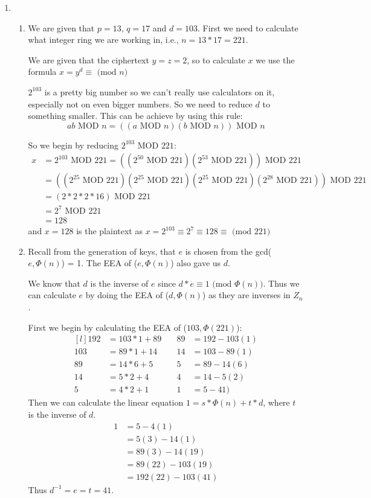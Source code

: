 \documentclass{article}
\begin{document}
\begin{enumerate}
		\item 
		\begin{enumerate}
			\item We are given that $p = 13$, $q = 17$ and $d = 103$. First we need to calculate what integer ring we are working in, i.e., $n = 13* 17 = 221$.
			
			We are given that the ciphertext $y = z = 2$, so to calculate $x$ we use the formula $x = y^d \equiv \text{ (mod } n)$
			
			$2^{103}$ is a pretty big number so we can't really use calculators on it, especially not on even bigger numbers. So we need to reduce $d$ to something smaller. This can be achieve by using this rule:
			$$
			ab \text{ MOD } n = ((a \text{ MOD } n)(b \text{ MOD } n)) \text{ MOD } n
			$$
			
			So we begin by reducing $2^{103} \text{ MOD } 221$:
			\[
			\begin{split}
				x&=2^{103} \text{ MOD } 221 = ((2^{50} \text{ MOD } 221)(2^{53} \text{ MOD } 221)) \text{ MOD } 221\\
				&=((2^{25} \text{ MOD } 221)(2^{25} \text{ MOD } 221)(2^{25} \text{ MOD } 221)(2^{28} \text{ MOD } 221)) \text{ MOD } 221\\
				&=(2*2*2*16) \text{ MOD } 221\\
				&=2^7 \text{ MOD } 221\\
				&=128
			\end{split}
			\]
			and $x = 128$ is the plaintext as $x = 2^{103} \equiv 2^7 \equiv 128 \equiv \text{ (mod } 221)$
			
			\item Recall from the generation of keys, that $e$ is chosen from the gcd($e, \Phi(n)$) = 1. The EEA of ($e, \Phi(n)$) also gave us $d$. 
			
			We know that $d$ is the inverse of $e$ since $d*e \equiv 1 \text{ (mod } \Phi(n))$. Thus we can calculate $e$ by doing the EEA of ($d, \Phi(n)$) as they are inverses in $Z_n$.
			
			First we begin by calculating the EEA of ($103, \Phi(221)$):
			\[
			\begin{matrix*}[l]
				192&=103 * 1 + 89 & \quad89& = 192 -103(1)\\
				103&=89*1+14 &\quad 14&=103-89(1)\\
				89&=14*6+5 & \quad5 &= 89-14(6)\\
				14&=5*2+4 &\quad 4 &=14-5(2)\\
				5&=4 *2 +1 &\quad 1 &=5-41)
			\end{matrix*}
			\]
			Then we can calculate the linear equation $1 = s*\Phi(n) + t*d$, where $t$ is the inverse of $d$. 
			\[
			\begin{split}
				1&=5-4(1)\\
				&=5(3)-14(1)\\
				&=89(3)-14(19)\\
				&=89(22)-103(19)\\
				&=192(22)-103(41)
			\end{split}
			\] 
			Thus $d^{-1} = e = t = 41$.
			


\end{enumerate}
\end{enumerate}
\end{document}
